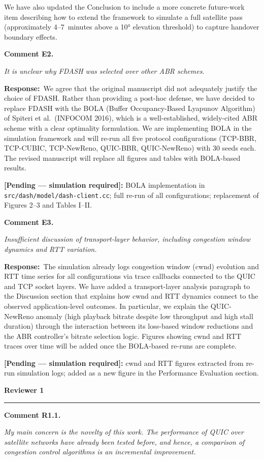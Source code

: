 \documentclass[11pt]{article}
\newcommand{\reviewer}[1]{\vspace{1em}\noindent\textbf{\large #1}\vspace{0.4em}\hrule\vspace{0.6em}}
\newcommand{\comment}[2]{\vspace{0.8em}\noindent\textbf{Comment #1.}\begin{reviewbox}\textit{#2}\end{reviewbox}}
\newcommand{\response}{\noindent\textbf{Response:}~}
\newcommand{\pending}[1]{\textcolor{red!70!black}{\textbf{[Pending — simulation required]:} #1}}
\begin{document}
We have also updated the Conclusion to include a more concrete future-work item describing how to extend the framework to simulate a full satellite pass (approximately 4--7~minutes above a 10° elevation threshold) to capture handover boundary effects.

\comment{E2}{It is unclear why FDASH was selected over other ABR schemes.}

\response We agree that the original manuscript did not adequately justify the choice of FDASH. Rather than providing a post-hoc defense, we have decided to replace FDASH with the BOLA (Buffer Occupancy-Based Lyapunov Algorithm) of Spiteri et al.\ (INFOCOM 2016), which is a well-established, widely-cited ABR scheme with a clear optimality formulation. We are implementing BOLA in the simulation framework and will re-run all five protocol configurations (TCP-BBR, TCP-CUBIC, TCP-NewReno, QUIC-BBR, QUIC-NewReno) with 30 seeds each. The revised manuscript will replace all figures and tables with BOLA-based results.

\pending{BOLA implementation in \texttt{src/dash/model/dash-client.cc}; full re-run of all configurations; replacement of Figures 2--3 and Tables I--II.}

\comment{E3}{Insufficient discussion of transport-layer behavior, including congestion window dynamics and RTT variation.}

\response The simulation already logs congestion window (cwnd) evolution and RTT time series for all configurations via trace callbacks connected to the QUIC and TCP socket layers. We have added a transport-layer analysis paragraph to the Discussion section that explains how cwnd and RTT dynamics connect to the observed application-level outcomes. In particular, we explain the QUIC-NewReno anomaly (high playback bitrate despite low throughput and high stall duration) through the interaction between its loss-based window reductions and the ABR controller's bitrate selection logic. Figures showing cwnd and RTT traces over time will be added once the BOLA-based re-runs are complete.

\pending{cwnd and RTT figures extracted from re-run simulation logs; added as a new figure in the Performance Evaluation section.}

\reviewer{Reviewer 1}

\comment{R1.1}{My main concern is the novelty of this work. The performance of QUIC over satellite networks have already been tested before, and hence, a comparison of congestion control algorithms is an incremental improvement.}
\end{document}
